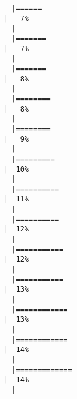 \documentclass[12pt]{article}
\begin{document}
\begin{verbatim}
  |======                                                                                    |   7%
  |                                                                                                
  |=======                                                                                   |   7%
  |                                                                                                
  |=======                                                                                   |   8%
  |                                                                                                
  |========                                                                                  |   8%
  |                                                                                                
  |========                                                                                  |   9%
  |                                                                                                
  |=========                                                                                 |  10%
  |                                                                                                
  |==========                                                                                |  11%
  |                                                                                                
  |==========                                                                                |  12%
  |                                                                                                
  |===========                                                                               |  12%
  |                                                                                                
  |===========                                                                               |  13%
  |                                                                                                
  |============                                                                              |  13%
  |                                                                                                
  |============                                                                              |  14%
  |                                                                                                
  |=============                                                                             |  14%
  |                                                                                                

\end{verbatim}
\end{document}
